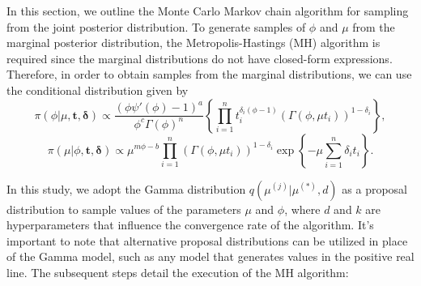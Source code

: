 In this section, we outline the Monte Carlo Markov chain algorithm for sampling from the joint posterior distribution.  To generate samples of $\phi$ and $\mu$ from the marginal posterior distribution, the Metropolis-Hastings (MH) algorithm is required since the marginal distributions do not have closed-form expressions. Therefore, in order to obtain samples from the marginal distributions, we can use the conditional distribution given by 
\begin{equation}\label{cond1}
\pi(\phi|\mu,\boldsymbol{t,\delta})\propto \frac{(\phi\psi'(\phi)-1)^{a}}{\phi^{c}\Gamma(\phi)^n}\left\{\prod_{i=1}^n{t_i^{\delta_i(\phi-1)}}\left(\Gamma(\phi,\mu t_i)\right)^{1-\delta_i}\right\},
\end{equation}
\begin{equation*}%
\pi(\mu|\phi,\boldsymbol{t,\delta})\propto \mu^{m\phi-b}\prod_{i=1}^n\left(\Gamma(\phi,\mu t_i)\right)^{1-\delta_i}\exp\left\{-\mu\sum_{i=1}^n {\delta_i}t_i\right\}.
\end{equation*}


In this study, we adopt the Gamma distribution $q(\mu^{(j)}|\mu^{(*)},d)$ as a proposal distribution to sample values of the parameters $\mu$ and $\phi$, where $d$ and $k$ are hyperparameters that influence the convergence rate of the algorithm. It's important to note that alternative proposal distributions can be utilized in place of the Gamma model, such as any model that generates values in the positive real line. The subsequent steps detail the execution of the MH algorithm:

